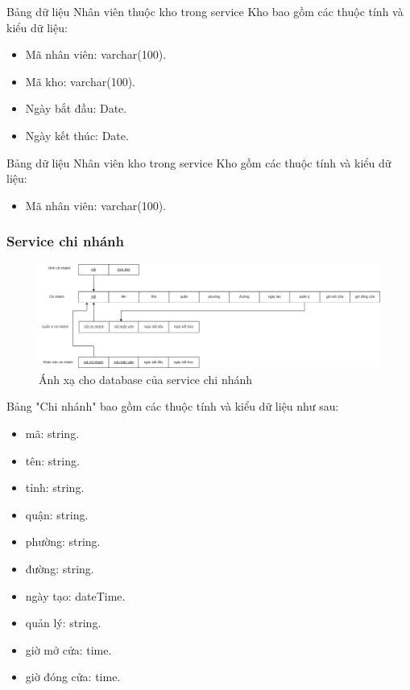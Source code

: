 Bảng dữ liệu Nhân viên thuộc kho trong service Kho bao gồm các thuộc tính và kiểu dữ liệu:
\begin{itemize}
	\item Mã nhân viên: varchar(100).
	\item Mã kho: varchar(100).
	\item Ngày bắt đầu: Date.
	\item Ngày kết thúc: Date.
\end{itemize}

Bảng dữ liệu Nhân viên kho trong service Kho gồm các thuộc tính và kiểu dữ liệu:
\begin{itemize}
	\item Mã nhân viên: varchar(100).
\end{itemize}



\subsubsection{Service chi nhánh}
\begin{figure}[!htp]
	\begin{center}
		\includegraphics[width=1\textwidth]{img/database/mapping/branch.png}
		\newline
		\caption{Ánh xạ cho database của service chi nhánh}
	\end{center}
\end{figure}

Bảng "Chi nhánh" bao gồm các thuộc tính và kiểu dữ liệu như sau:
\begin{itemize}
	\item mã: string.
	\item tên: string.
	\item tỉnh: string.
	\item quận: string.
	\item phường: string.
	\item đường: string.
	\item ngày tạo: dateTime.
	\item quản lý: string.
	\item giờ mở cửa: time.
	\item giờ đóng cửa: time.
\end{itemize}

